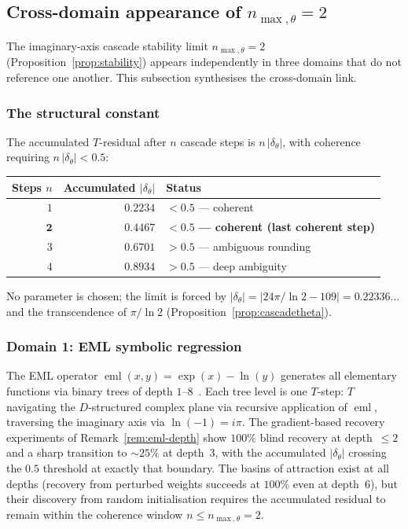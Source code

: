 \documentclass[11pt,a4paper]{article}
\theoremstyle{definition}
\theoremstyle{remark}
\begin{document}
\subsection{Cross-domain appearance of $n_{\max,\theta}=2$}\label{subsec:cross-domain-nmax}

The imaginary-axis cascade stability limit $n_{\max,\theta}=2$ (Proposition~\ref{prop:stability}) appears independently in three domains that do not reference one another. This subsection synthesises the cross-domain link.

\subsubsection*{The structural constant}

The accumulated $T$-residual after $n$ cascade steps is $n\,|\delta_{\theta}|$, with coherence requiring $n\,|\delta_{\theta}| < 0.5$:
\begin{center}
\begin{tabular}{@{}r r l@{}}
\toprule
Steps $n$ & Accumulated $|\delta_{\theta}|$ & Status\\
\midrule
$1$ & $0.2234$ & $< 0.5$ --- coherent\\
$\mathbf{2}$ & $\mathbf{0.4467}$ & $\mathbf{< 0.5}$ \textbf{--- coherent (last coherent step)}\\
$3$ & $0.6701$ & $> 0.5$ --- ambiguous rounding\\
$4$ & $0.8934$ & $> 0.5$ --- deep ambiguity\\
\bottomrule
\end{tabular}
\end{center}
No parameter is chosen; the limit is forced by $|\delta_{\theta}| = |24\pi/\ln 2 - 109| = 0.22336\ldots$ and the transcendence of $\pi/\ln 2$ (Proposition~\ref{prop:cascadetheta}).

\subsubsection*{Domain 1: EML symbolic regression}

The EML operator $\operatorname{eml}(x,y) = \exp(x) - \ln(y)$ generates all elementary functions via binary trees of depth $1$--$8$~\cite{Odrzywolek2026}. Each tree level is one $T$-step: $T$ navigating the $D$-structured complex plane via recursive application of $\operatorname{eml}$, traversing the imaginary axis via $\ln(-1) = i\pi$. The gradient-based recovery experiments of Remark~\ref{rem:eml-depth} show $100\%$ blind recovery at depth~$\le 2$ and a sharp transition to $\sim 25\%$ at depth~$3$, with the accumulated $|\delta_{\theta}|$ crossing the $0.5$ threshold at exactly that boundary. The basins of attraction exist at all depths (recovery from perturbed weights succeeds at $100\%$ even at depth~$6$), but their discovery from random initialisation requires the accumulated residual to remain within the coherence window $n \le n_{\max,\theta}=2$.
\end{document}
